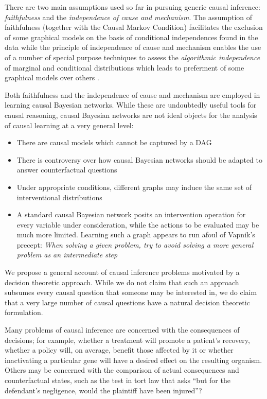 There are two main assumptions used so far in pursuing generic causal inference: \emph{faithfulness} and the \emph{independence of cause and mechanism}. The assumption of faithfulness (together with the Causal Markov Condition) facilitates the exclusion of some graphical models on the basis of conditional independences found in the data \citep{spirtes_causation_1993} while the principle of independence of cause and mechanism enables the use of a number of special purpose techniques to assess the \emph{algorithmic independence} of marginal and conditional distributions which leads to preferment of some graphical models over others \citep{lemeire_replacing_2013, peters_identifiability_2012}.



Both faithfulness and the independence of cause and mechanism are employed in learning causal Bayesian networks. While these are undoubtedly useful tools for causal reasoning, causal Bayesian networks are not ideal objects for the analysis of causal learning at a very general level:
\begin{itemize}
    \item There are causal models which cannot be captured by a DAG \citep{dawid_beware_2010,bongers_theoretical_2016}
    \item There is controversy over how causal Bayesian networks should be adapted to answer counterfactual questions \citep{richardson2013single}
    \item Under appropriate conditions, different graphs may induce the same set of interventional distributions \citep{peters_structural_2015}
    \item A standard causal Bayesian network posits an intervention operation for every variable under consideration, while the actions to be evaluated may be much more limited. Learning such a graph appears to run afoul of Vapnik's precept: \emph{When solving a given problem, try to avoid solving a more general problem as an intermediate step} \citep{vapnik_nature_2013}
\end{itemize}

We propose a general account of causal inference problems motivated by a decision theoretic approach. While we do not claim that such an approach subsumes every causal question that someone may be interested in, we do claim that a very large number of causal questions have a natural decision theoretic formulation.

Many problems of causal inference are concerned with the consequences of decisions; for example, whether a treatment will promote a patient's recovery, whether a policy will, on average, benefit those affected by it or whether inactivating a particular gene will have a desired effect on the resulting organism. Others may be concerned with the comparison of actual consequences and counterfactual states, such as the test in tort law that asks ``but for the defendant's negligence, would the plaintiff have been injured''?

